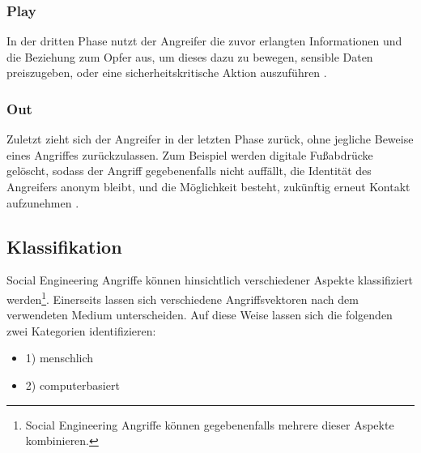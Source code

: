 \subsubsection{Play}
In der dritten Phase nutzt der Angreifer die zuvor erlangten Informationen und die Beziehung zum Opfer aus,
um dieses dazu zu bewegen, sensible Daten preiszugeben, oder eine sicherheitskritische Aktion auszuführen .

\subsubsection{Out}
Zuletzt zieht sich der Angreifer in der letzten Phase zurück, ohne jegliche Beweise eines Angriffes zurückzulassen.
Zum Beispiel werden digitale Fußabdrücke gelöscht, sodass der Angriff gegebenenfalls nicht auffällt,
die Identität des Angreifers anonym bleibt, und die Möglichkeit besteht, zukünftig erneut Kontakt aufzunehmen .

\subsection{Klassifikation}

Social Engineering Angriffe können hinsichtlich verschiedener Aspekte klassifiziert werden\footnote{Social Engineering Angriffe können gegebenenfalls mehrere dieser Aspekte kombinieren.}.
Einerseits lassen sich verschiedene Angriffsvektoren nach dem verwendeten Medium unterscheiden.
Auf diese Weise lassen sich die folgenden zwei Kategorien identifizieren:

\begin{minipage}{.5\linewidth}
    \begin{itemize}
        \setlength\itemsep{1em}
        \item 1) menschlich
        \item 2) computerbasiert
    \end{itemize}
\end{minipage}
\hfill
\begin{minipage}{.5\linewidth}
    \centering
\end{minipage}

